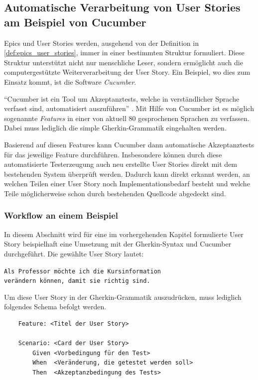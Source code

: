 \documentclass[acmtog]{acmart}
\begin{document}
\subsection{Automatische Verarbeitung von User Stories am Beispiel von Cucumber}
Epics und User Stories werden, ausgehend von der Definition in \ref{def:epics_user_stories}, immer in einer bestimmten Struktur formuliert.
Diese Struktur unterstützt nicht nur menschliche Leser, sondern ermöglicht auch die computergestützte Weiterverarbeitung der User Story.
Ein Beispiel, wo dies zum Einsatz kommt, ist die Software \emph{Cucumber}.

``Cucumber ist ein Tool um Akzeptanztests, welche in verständlicher Sprache verfasst sind, automatisiert auszuführen'' \cite{the_cucumber_open_source_project_cucumber_2025}.
Mit Hilfe von Cucumber ist es möglich sogenannte \emph{Features} in einer von aktuell 80 gesprochenen Sprachen zu verfassen.
Dabei muss lediglich die simple Gherkin-Grammatik eingehalten werden.

Basierend auf diesen Features kann Cucumber dann automatische Akzeptanztests für das jeweilige Feature durchführen.
Insbesondere können durch diese automatisierte Testerzeugung auch neu erstellte User Stories direkt mit dem bestehenden System
überprüft werden. Dadurch kann direkt erkannt werden, an welchen Teilen einer User Story noch Implementationsbedarf besteht und welche
Teile möglicherweise schon durch bestehenden Quellcode abgedeckt sind.

\subsubsection{Workflow an einem Beispiel}
In diesem Abschnitt wird für eine im vorhergehenden Kapitel formulierte User Story beispielhaft eine Umsetzung
mit der Gherkin-Syntax und Cucumber durchgeführt.
Die gewählte User Story lautet:

\texttt{Als Professor möchte ich die Kursinformation \\verändern können, damit sie richtig sind.}

Um diese User Story in der Gherkin-Grammatik auszudrücken, muss lediglich folgendes Schema befolgt werden.

\vspace*{-1em}
\begin{listing}[!h]
	\begin{tcolorbox}[colframe=black, colback=white, opacityback=1.0, sharp corners, boxrule=.4pt, width=\linewidth]
		\vspace*{-.6em}
		\begin{verbatim}
    Feature: <Titel der User Story>

    Scenario: <Card der User Story>
        Given <Vorbedingung für den Test>
        When  <Veränderung, die getestet werden soll>
        Then  <Akzeptanzbedingung des Tests>
    \end{verbatim}
		\vspace*{-.6em}
	\end{tcolorbox}
	\vspace*{-1em}
\end{listing}
\end{document}
